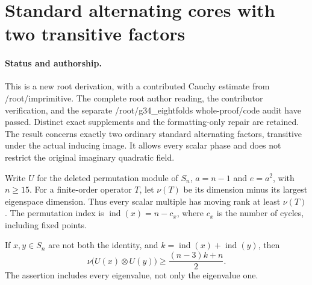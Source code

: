 \section{Standard alternating cores with two transitive factors}
\label{sec:standard-two-factor}

\paragraph{Status and authorship.}
This is a new root derivation, with a contributed Cauchy estimate from
/root/imprimitive. The complete root author reading, the contributor verification, and
the separate /root/g34\_eightfolds whole-proof/code audit have passed.
Distinct exact supplements and the formatting-only repair are retained. The result concerns exactly two ordinary standard
alternating factors, transitive under the actual inducing image.
It allows every scalar phase and does not restrict the original
imaginary quadratic field.

Write $U$ for the deleted permutation module of $S_n$,
$a=n-1$ and $e=a^2$, with $n\ge15$. For a finite-order
operator $T$, let $\nu(T)$ be its dimension minus its largest
eigenspace dimension. Thus every scalar multiple has moving rank
at least $\nu(T)$. The permutation index is
$\operatorname{ind}(x)=n-c_x$, where $c_x$ is the number of
cycles, including fixed points.

\begin{lemma}
\label{HD-AST-07}
If $x,y\in S_n$ are not both the identity, and
$k=\operatorname{ind}(x)+\operatorname{ind}(y)$, then
\[
 \nu\bigl(U(x)\otimes U(y)\bigr)
       \ge \frac{(n-3)k+n}{2}.                         \tag{AST2.1}
\]
The assertion includes every eigenvalue, not only the eigenvalue one.
\end{lemma}

